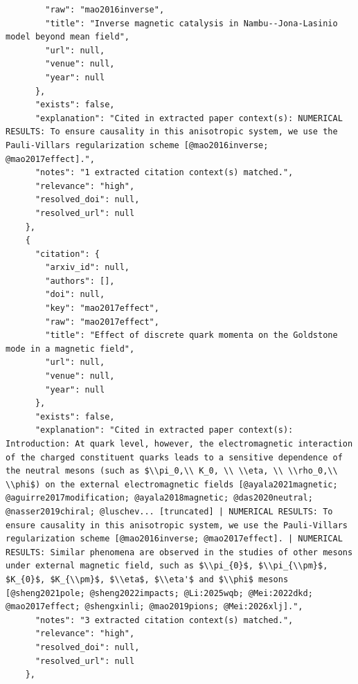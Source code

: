 \documentclass[11pt]{article}
\begin{document}
\begin{verbatim}
        "raw": "mao2016inverse",
        "title": "Inverse magnetic catalysis in Nambu--Jona-Lasinio model beyond mean field",
        "url": null,
        "venue": null,
        "year": null
      },
      "exists": false,
      "explanation": "Cited in extracted paper context(s): NUMERICAL RESULTS: To ensure causality in this anisotropic system, we use the Pauli-Villars regularization scheme [@mao2016inverse; @mao2017effect].",
      "notes": "1 extracted citation context(s) matched.",
      "relevance": "high",
      "resolved_doi": null,
      "resolved_url": null
    },
    {
      "citation": {
        "arxiv_id": null,
        "authors": [],
        "doi": null,
        "key": "mao2017effect",
        "raw": "mao2017effect",
        "title": "Effect of discrete quark momenta on the Goldstone mode in a magnetic field",
        "url": null,
        "venue": null,
        "year": null
      },
      "exists": false,
      "explanation": "Cited in extracted paper context(s): Introduction: At quark level, however, the electromagnetic interaction of the charged constituent quarks leads to a sensitive dependence of the neutral mesons (such as $\\pi_0,\\ K_0, \\ \\eta, \\ \\rho_0,\\ \\phi$) on the external electromagnetic fields [@ayala2021magnetic; @aguirre2017modification; @ayala2018magnetic; @das2020neutral; @nasser2019chiral; @luschev... [truncated] | NUMERICAL RESULTS: To ensure causality in this anisotropic system, we use the Pauli-Villars regularization scheme [@mao2016inverse; @mao2017effect]. | NUMERICAL RESULTS: Similar phenomena are observed in the studies of other mesons under external magnetic field, such as $\\pi_{0}$, $\\pi_{\\pm}$, $K_{0}$, $K_{\\pm}$, $\\eta$, $\\eta'$ and $\\phi$ mesons [@sheng2021pole; @sheng2022impacts; @Li:2025wqb; @Mei:2022dkd; @mao2017effect; @shengxinli; @mao2019pions; @Mei:2026xlj].",
      "notes": "3 extracted citation context(s) matched.",
      "relevance": "high",
      "resolved_doi": null,
      "resolved_url": null
    },

\end{verbatim}
\end{document}
